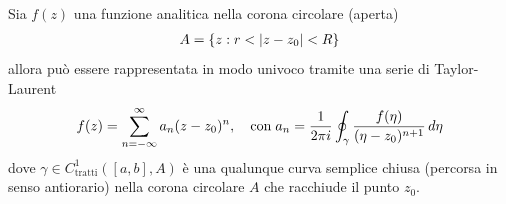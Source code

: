 \begin{theorem}[  ]
  Sia $ f(z) $ una funzione analitica nella corona circolare (aperta)
  \begin{align}
    A = \{z: r < \left|{z - z_0}\right| < R \}
  \end{align}
  allora può essere rappresentata in modo univoco tramite una serie di Taylor-Laurent
  \begin{align}
    f(z) = \sum_{n = -\infty}^\infty a_n (z - z_0)^n, \quad \textnormal{con}\; 
    a_n = \frac1{2\pi i} \oint_\gamma \frac{f(\eta)}{(\eta - z_0)^{n+1}} \, d\eta
  \end{align}
  dove $ \gamma \in C^1_{\text{tratti}}([a,b], A) $ è una qualunque curva semplice chiusa (percorsa in senso antiorario) nella corona circolare 
  $ A $ che racchiude il punto $ z_0 $.
\end{theorem}
